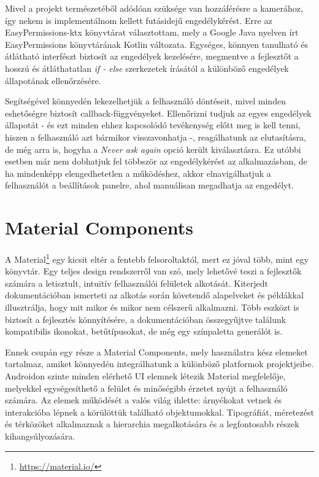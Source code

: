 Mivel a projekt természetéből adódóan szüksége van hozzáférésre a kamerához, így nekem is implementálnom kellett futásidejű engedélykérést. Erre az EasyPermissions-ktx könyvtárat választottam, mely a Google Java nyelven írt EasyPermissions könyvtárának Kotlin változata. Egységes, könnyen tanulható és átlátható interfészt biztosít az engedélyek kezelésére, megmentve a fejlesztőt a hosszú és átláthatatlan \emph{if - else} szerkezetek írásától a különböző engedélyek állapotának ellenőrzésére. 

Segítségével könnyedén lekezelhetjük a felhasználó döntéseit, mivel minden eshetőségre biztosít callback-függvényeket. Ellenőrizni tudjuk az egyes engedélyek állapotát - és ezt minden ehhez kapcsolódó tevékenység előtt meg is kell tenni, hiszen a felhasználó azt bármikor visszavonhatja -, reagálhatunk az elutasításra, de még arra is, hogyha a \emph{Never ask again} opció került kiválasztásra. Ez utóbbi esetben már nem dobhatjuk fel többször az engedélykérést az alkalmazásban, de ha mindenképp elengedhetetlen a működéshez, akkor elnavigálhatjuk a felhasználót a beállítások panelre, ahol manuálisan megadhatja az engedélyt. 

\section{Material Components}

A Material\footnote{\url{https://material.io/}} egy kicsit eltér a fentebb felsoroltaktól, mert ez jóval több, mint egy könyvtár. Egy teljes design rendszerről van szó, mely lehetővé teszi a fejlesztők számára a letisztult, intuitív felhasználói felületek alkotását. Kiterjedt dokumentációban ismerteti az alkotás során követendő alapelveket és példákkal illusztrálja, hogy mit mikor és mikor nem célszerű alkalmazni. Több eszközt is biztosít a fejlesztés könnyítésére, a dokumentációban összegyűjtve találunk kompatibilis ikonokat, betűtípusokat, de még egy színpaletta generálót is. 

Ennek csupán egy része a Material Components, mely használatra kész elemeket tartalmaz, amiket könnyedén integrálhatunk a különböző platformok projektjeibe. Androidon szinte minden elérhető UI elemnek létezik Material megfelelője, melyekkel egységesíthető a felület és minőségibb érzetet nyújt a felhasználó számára. Az elemek működését a valós világ ihlette: árnyékokat vetnek és interakcióba lépnek a körülöttük található objektumokkal. Tipográfiát, méretezést és térközöket alkalmaznak a hierarchia megalkotására és a legfontosabb részek kihangsúlyozására.

